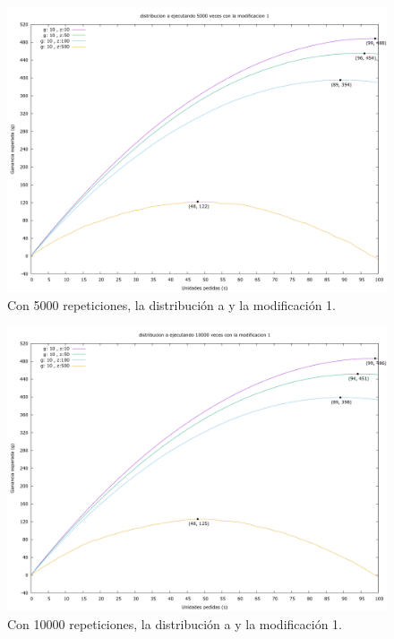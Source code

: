 \documentclass[12pt, spanish]{article}
\begin{document}
\begin{figure}[H]
	\centering
	\includegraphics[scale = 0.2]{prob_a/datos_a_5000_1.png}
	\caption{Con 5000 repeticiones, la distribución a y la modificación 1.}
	\label{fig:ej1_a_5000}

\end{figure}


\begin{figure}[H]
	\centering
	\includegraphics[scale = 0.2]{prob_a/datos_a_10000_1.png}
	\caption{Con 10000 repeticiones, la distribución a y la modificación 1.}
	\label{fig:ej1_a_10000}

\end{figure}
\end{document}
